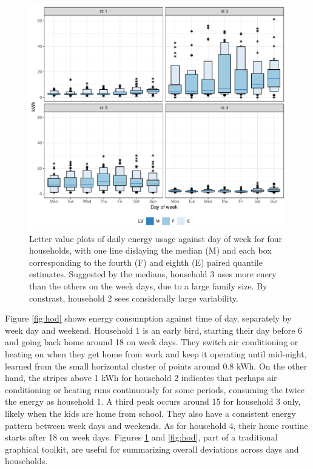 \documentclass[12pt]{article}
\begin{document}
\begin{figure}

{\centering \includegraphics[width=\textwidth]{figure/dow-1} 

}

\caption{Letter value plots of daily energy usage against day of week for four households, with one line dislaying the median (M) and each box corresponding to the fourth (F) and eighth (E) paired quantile estimates. Suggested by the medians, household 3 uses more enery than the others on the week days, due to a large family size. By constrast, household 2 sees considerally large variability.}\label{fig:dow}
\end{figure}

Figure \ref{fig:hod} shows energy consumption against time of day, separately by week day and weekend. Household 1 is an early bird, starting their day before 6 and going back home around 18 on week days. They switch air conditioning or heating on when they get home from work and keep it operating until mid-night, learned from the small horizontal cluster of points around 0.8 kWh. On the other hand, the stripes above 1 kWh for household 2 indicates that perhaps air conditioning or heating runs continuously for some periods, consuming the twice the energy as household 1. A third peak occurs around 15 for household 3 only, likely when the kids are home from school. They also have a consistent energy pattern between week days and weekends. As for household 4, their home routine starts after 18 on week days. Figures \ref{fig:dow} and \ref{fig:hod}, part of a traditional graphical toolkit, are useful for summarizing overall deviations across days and households.
\end{document}
